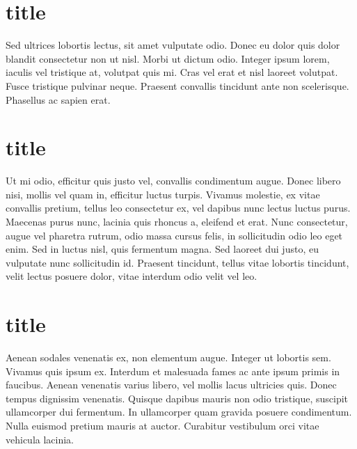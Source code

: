 \section{title}
Sed ultrices lobortis lectus, sit amet vulputate odio. Donec eu dolor quis dolor blandit consectetur non ut nisl. Morbi ut dictum odio. Integer ipsum lorem, iaculis vel tristique at, volutpat quis mi. Cras vel erat et nisl laoreet volutpat. Fusce tristique pulvinar neque. Praesent convallis tincidunt ante non scelerisque. Phasellus ac sapien erat.
\section{title}
Ut mi odio, efficitur quis justo vel, convallis condimentum augue. Donec libero nisi, mollis vel quam in, efficitur luctus turpis. Vivamus molestie, ex vitae convallis pretium, tellus leo consectetur ex, vel dapibus nunc lectus luctus purus. Maecenas purus nunc, lacinia quis rhoncus a, eleifend et erat. Nunc consectetur, augue vel pharetra rutrum, odio massa cursus felis, in sollicitudin odio leo eget enim. Sed in luctus nisl, quis fermentum magna. Sed laoreet dui justo, eu vulputate nunc sollicitudin id. Praesent tincidunt, tellus vitae lobortis tincidunt, velit lectus posuere dolor, vitae interdum odio velit vel leo.
\section{title}
Aenean sodales venenatis ex, non elementum augue. Integer ut lobortis sem. Vivamus quis ipsum ex. Interdum et malesuada fames ac ante ipsum primis in faucibus. Aenean venenatis varius libero, vel mollis lacus ultricies quis. Donec tempus dignissim venenatis. Quisque dapibus mauris non odio tristique, suscipit ullamcorper dui fermentum. In ullamcorper quam gravida posuere condimentum. Nulla euismod pretium mauris at auctor. Curabitur vestibulum orci vitae vehicula lacinia.